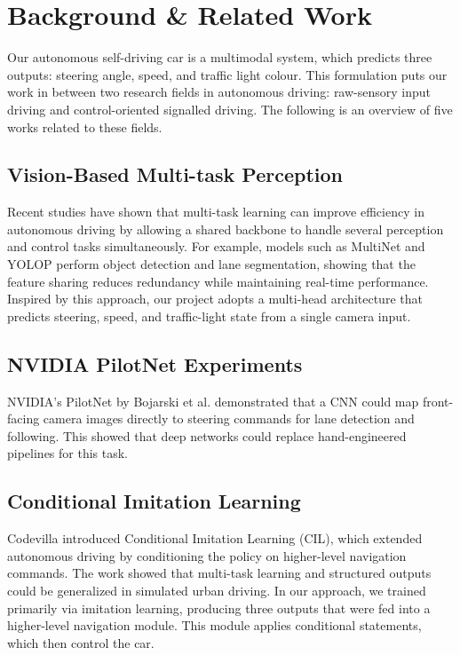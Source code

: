 \documentclass{article} %
\begin{document}
\section{Background \& Related Work}
Our autonomous self-driving car is a multimodal system, which predicts three outputs: steering angle, speed, and traffic light colour.
This formulation puts our work in between two research fields in autonomous driving: raw-sensory input driving and control-oriented signalled driving.
The following is an overview of five works related to these fields.

\subsection{Vision-Based Multi-task Perception \citep{3.1Ref}}
Recent studies have shown that multi-task learning can improve efficiency in autonomous driving by allowing a shared backbone to
handle several perception and control tasks simultaneously. For example, models such as MultiNet and YOLOP perform object detection and
lane segmentation, showing that the feature sharing reduces redundancy while maintaining real-time performance. Inspired by this approach,
our project adopts a multi-head architecture that predicts steering, speed, and traffic-light state from a single camera input.

\subsection{NVIDIA PilotNet Experiments \citep{3.2Ref}}
NVIDIA’s PilotNet by Bojarski et al. demonstrated that a CNN could map front-facing camera images
directly to steering commands for lane detection and following.
This showed that deep networks could replace hand-engineered pipelines for this task.

\subsection{Conditional Imitation Learning \citep{3.3Ref}}
Codevilla introduced Conditional Imitation Learning (CIL), which extended autonomous driving by conditioning the policy
on higher-level navigation commands. The work showed that multi-task learning and structured outputs could be generalized
in simulated urban driving. In our approach, we trained primarily via imitation learning, producing three outputs that were
fed into a higher-level navigation module. This module applies conditional statements, which then control the car.
\end{document}
